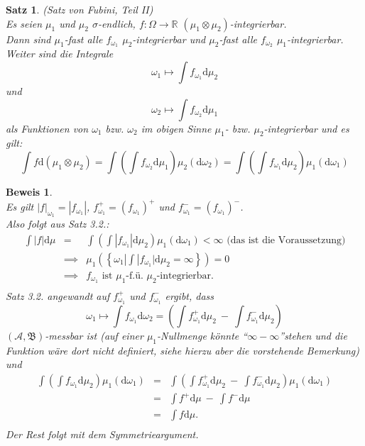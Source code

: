 \documentclass[a4paper,11pt]{book}
\newcommand{\R}{{\mathbb R}}
\def\AA{ \mathcal{A} }
\def\BB{ \mathfrak{B} }
\def\folgt{\ensuremath{\implies}}
\def\d{\mbox{d}}
\newtheorem{Sa}{Satz}[chapter]
\theoremstyle{nonumberplain}
\newtheorem{Bew}{Beweis}
\begin{document}
\begin{Sa} (Satz von Fubini, Teil II) \\
Es seien $\mu_1$ und $\mu_2$ $\sigma$-endlich, $f:\Omega\to\R$ $(\mu_1\otimes\mu_2)$-integrierbar. \\ Dann sind $\mu_1$-fast alle $f_{\omega_1}$ $\mu_2$-integrierbar und $\mu_2$-fast alle $f_{\omega_2}$ $\mu_1$-integrierbar. \\
Weiter sind die Integrale \\
$$\omega_1\mapsto\int f_{\omega_1}\d\mu_2$$ und $$\omega_2\mapsto\int f_{\omega_2}\d\mu_1$$ als Funktionen von $\omega_1$ bzw. $\omega_2$ im obigen Sinne $\mu_1$- bzw. $\mu_2$-integrierbar und es gilt:
\begin{displaymath}
\int f\d\left(\mu_1\otimes\mu_2\right) = \int\left(\int f_{\omega_2}\d\mu_1\right)\mu_2\left(\d\omega_2\right) = \int\left(\int f_{\omega_1}\d\mu_2\right)\mu_1\left(\d\omega_1\right)
\end{displaymath}
\end{Sa}
\begin{Bew} \quad\\
Es gilt $|f|_{\omega_1} = |f_{\omega_1}|$, $f_{\omega_1}^+ = (f_{\omega_1})^+$ und $f_{\omega_1}^- = (f_{\omega_1})^-$. \\
Also folgt aus Satz 3.2.:
\begin{eqnarray*}
\int|f|\d\mu & = & \int\left(\int|f_{\omega_1}|\d\mu_2\right)\mu_1\left(\d\omega_1\right) < \infty \text{ (das ist die Voraussetzung)} \\
 & \folgt & \mu_1\left(\left\{\omega_1|\int|f_{\omega_1}|\d\mu_2=\infty\right\}\right)=0 \\
 & \folgt & f_{\omega_1} \text{ ist } \mu_1 \text{-f.ü. } \mu_2 \text{-integrierbar.} \\
\end{eqnarray*}
Satz 3.2. angewandt auf $f_{\omega_1}^+$ und $f_{\omega_1}^-$ ergibt, dass 
\begin{displaymath}
\omega_1\mapsto\int f_{\omega_1}\d\omega_2 = \left(\int f_{\omega_1}^+\d\mu_2\ -\ \int f_{\omega_1}^-\d\mu_2\right)
\end{displaymath}
$(\AA,\BB)$-messbar ist (auf einer $\mu_1$-Nullmenge könnte \textquotedblleft$\infty - \infty$\textquotedblright stehen und die Funktion wäre dort nicht definiert, siehe hierzu aber die vorstehende Bemerkung) und
\begin{eqnarray*}
\int\left(\int f_{\omega_1}\d\mu_2\right)\mu_1\left(\d\omega_1\right) &=& \int\left(\int f_{\omega_1}^+\d\mu_2\ -\ \int f_{\omega_1}^-\d\mu_2\right)\mu_1\left(\d\omega_1\right) \\
 & = & \int f^+\d\mu\ -\ \int f^-\d\mu \\
 & = & \int f\d\mu. \\
\end{eqnarray*}
Der Rest folgt mit dem Symmetrieargument.
\end{Bew}
\end{document}
